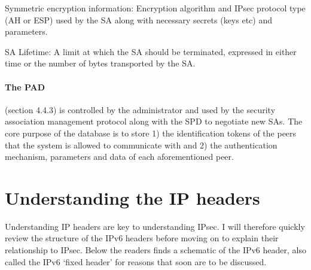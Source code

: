 \documentclass[final,a4paper,twoside,11pt,onecolumn]{report}
\begin{document}
Symmetric encryption information: Encryption algorithm and IPsec protocol type (AH or ESP) used by the SA along with necessary secrets (keys etc) and parameters.

SA Lifetime: A limit at which the SA should be terminated, expressed in either time or the number of bytes transported by the SA.



\paragraph{The PAD} (section 4.4.3) is controlled by the administrator and used by the security association management protocol along with the SPD to negotiate new SAs. The core purpose of the database is to store 1) the identification tokens of the peers that the system is allowed to communicate with and 2) the authentication mechanism, parameters and data of each aforementioned peer.



% 

% 

\section{Understanding the IP headers}
\label{sec:uiphdr}
Understanding IP headers are key to understanding IPsec. I will therefore quickly review the structure of the IPv6 headers before moving on to explain their relationship to IPsec. Below the readers finds a schematic of the IPv6 header, also called the IPv6 `fixed header' for reasons that soon are to be discussed.
\end{document}
